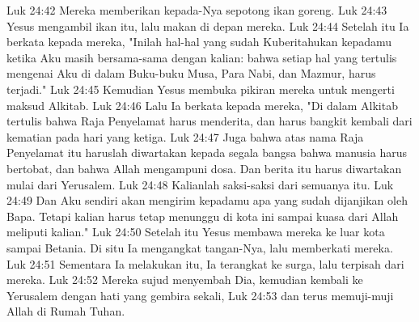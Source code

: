Luk 24:42  Mereka memberikan kepada-Nya sepotong ikan goreng.
Luk 24:43  Yesus mengambil ikan itu, lalu makan di depan mereka.
Luk 24:44  Setelah itu Ia berkata kepada mereka, "Inilah hal-hal yang sudah Kuberitahukan kepadamu ketika Aku masih bersama-sama dengan kalian: bahwa setiap hal yang tertulis mengenai Aku di dalam Buku-buku Musa, Para Nabi, dan Mazmur, harus terjadi."
Luk 24:45  Kemudian Yesus membuka pikiran mereka untuk mengerti maksud Alkitab.
Luk 24:46  Lalu Ia berkata kepada mereka, "Di dalam Alkitab tertulis bahwa Raja Penyelamat harus menderita, dan harus bangkit kembali dari kematian pada hari yang ketiga.
Luk 24:47  Juga bahwa atas nama Raja Penyelamat itu haruslah diwartakan kepada segala bangsa bahwa manusia harus bertobat, dan bahwa Allah mengampuni dosa. Dan berita itu harus diwartakan mulai dari Yerusalem.
Luk 24:48  Kalianlah saksi-saksi dari semuanya itu.
Luk 24:49  Dan Aku sendiri akan mengirim kepadamu apa yang sudah dijanjikan oleh Bapa. Tetapi kalian harus tetap menunggu di kota ini sampai kuasa dari Allah meliputi kalian."
Luk 24:50  Setelah itu Yesus membawa mereka ke luar kota sampai Betania. Di situ Ia mengangkat tangan-Nya, lalu memberkati mereka.
Luk 24:51  Sementara Ia melakukan itu, Ia terangkat ke surga, lalu terpisah dari mereka.
Luk 24:52  Mereka sujud menyembah Dia, kemudian kembali ke Yerusalem dengan hati yang gembira sekali,
Luk 24:53  dan terus memuji-muji Allah di Rumah Tuhan.


